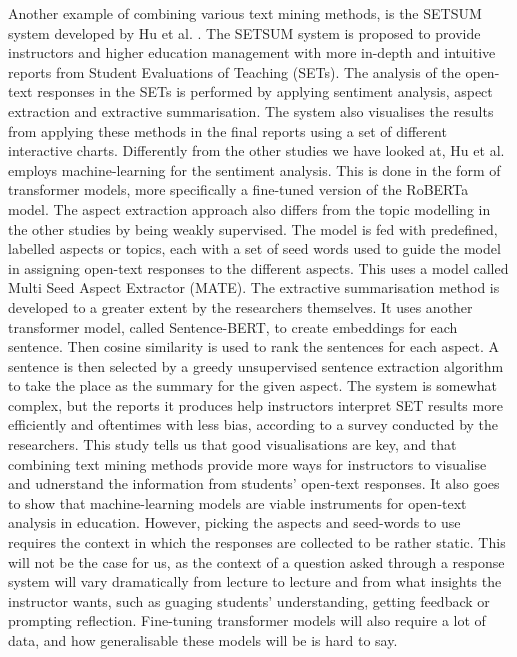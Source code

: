 Another example of combining various text mining methods, is the SETSUM system developed by Hu et al. \cite{setsum2022}. The SETSUM system is proposed to provide instructors and higher education management with more in-depth and intuitive reports from Student Evaluations of Teaching (SETs). The analysis of the open-text responses in the SETs is performed by applying sentiment analysis, aspect extraction and extractive summarisation. The system also visualises the results from applying these methods in the final reports using a set of different interactive charts. Differently from the other studies we have looked at, Hu et al. employs machine-learning for the sentiment analysis. This is done in the form of transformer models, more specifically a fine-tuned version of the RoBERTa model. The aspect extraction approach also differs from the topic modelling in the other studies by being weakly supervised. The model is fed with predefined, labelled aspects or topics, each with a set of seed words used to guide the model in assigning open-text responses to the different aspects. This uses a model called Multi Seed Aspect Extractor (MATE). The extractive summarisation method is developed to a greater extent by the researchers themselves. It uses another transformer model, called Sentence-BERT, to create embeddings for each sentence. Then cosine similarity is used to rank the sentences for each aspect. A sentence is then selected by a greedy unsupervised sentence extraction algorithm to take the place as the summary for the given aspect. The system is somewhat complex, but the reports it produces help instructors interpret SET results more efficiently and oftentimes with less bias, according to a survey conducted by the researchers. This study tells us that good visualisations are key, and that combining text mining methods provide more ways for instructors to visualise and udnerstand the information from students' open-text responses. It also goes to show that machine-learning models are viable instruments for open-text analysis in education. However, picking the aspects and seed-words to use requires the context in which the responses are collected to be rather static. This will not be the case for us, as the context of a question asked through a response system will vary dramatically from lecture to lecture and from what insights the instructor wants, such as guaging students' understanding, getting feedback or prompting reflection. Fine-tuning transformer models will also require a lot of data, and how generalisable these models will be is hard to say.

